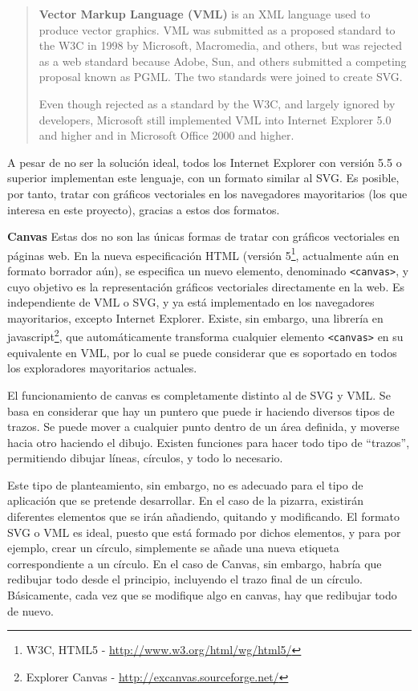 \begin{quote}
	\textbf{Vector Markup Language (VML)} is an XML language used to produce vector graphics. VML was submitted as a proposed standard to the W3C in 1998 by Microsoft, Macromedia, and others, but was rejected as a web standard because Adobe, Sun, and others submitted a competing proposal known as PGML. The two standards were joined to create SVG.

Even though rejected as a standard by the W3C, and largely ignored by developers, Microsoft still implemented VML into Internet Explorer 5.0 and higher and in Microsoft Office 2000 and higher.
\end{quote}

A pesar de no ser la solución ideal, todos los Internet Explorer con versión 5.5 o superior implementan este lenguaje, con un formato similar al SVG. Es posible, por tanto, tratar con gráficos vectoriales en los navegadores mayoritarios (los que interesa en este proyecto), gracias a estos dos formatos. 

\textbf{Canvas}
Estas dos no son las únicas formas de tratar con gráficos vectoriales en páginas web. En la nueva especificación HTML (versión 5\footnote{W3C, HTML5 - \url{http://www.w3.org/html/wg/html5/}}, actualmente aún en formato borrador aún), se especifica un nuevo elemento, denominado \texttt{<canvas>}, y cuyo objetivo es la representación gráficos vectoriales directamente en la web. Es independiente de VML o SVG, y ya está implementado en los navegadores mayoritarios, excepto Internet Explorer. Existe, sin embargo, una librería en javascript\footnote{Explorer Canvas - \url{http://excanvas.sourceforge.net/}}, que automáticamente transforma cualquier elemento \texttt{<canvas>} en su equivalente en VML, por lo cual se puede considerar que es soportado en todos los exploradores mayoritarios actuales.

El funcionamiento de canvas es completamente distinto al de SVG y VML. Se basa en considerar que hay un puntero que puede ir haciendo diversos tipos de trazos. Se puede mover a cualquier punto dentro de un área definida, y moverse hacia otro haciendo el dibujo. Existen funciones para hacer todo tipo de ``trazos'', permitiendo dibujar líneas, círculos, y todo lo necesario.

Este tipo de planteamiento, sin embargo, no es adecuado para el tipo de aplicación que se pretende desarrollar. En el caso de la pizarra, existirán diferentes elementos que se irán añadiendo, quitando y modificando. El formato SVG o VML es ideal, puesto que está formado por dichos elementos, y para por ejemplo, crear un círculo, simplemente se añade una nueva etiqueta correspondiente a un círculo. En el caso de Canvas, sin embargo, habría que redibujar todo desde el principio, incluyendo el trazo final de un círculo. Básicamente, cada vez que se modifique algo en canvas, hay que redibujar todo de nuevo.

